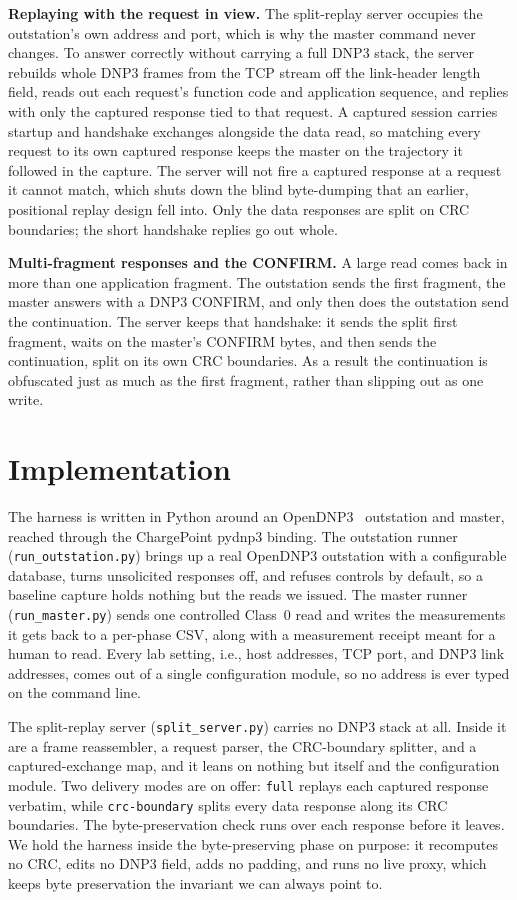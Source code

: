 \documentclass[conference]{IEEEtran}
\newcommand{\code}[1]{\texttt{#1}}
\begin{document}
\noindent\textbf{Replaying with the request in view.} The split-replay server
occupies the outstation's own address and port, which is why the master command
never changes. To answer correctly without carrying a full DNP3 stack, the server
rebuilds whole DNP3 frames from the TCP stream off the link-header length field,
reads out each request's function code and application sequence, and replies with
only the captured response tied to that request. A captured session carries
startup and handshake exchanges alongside the data read, so matching every
request to its own captured response keeps the master on the trajectory it
followed in the capture. The server will not fire a captured response at a request
it cannot match, which shuts down the blind byte-dumping that an earlier,
positional replay design fell into. Only the data responses are split on CRC
boundaries; the short handshake replies go out whole.

\noindent\textbf{Multi-fragment responses and the CONFIRM.} A large read comes
back in more than one application fragment. The outstation sends the first
fragment, the master answers with a DNP3 CONFIRM, and only then does the
outstation send the continuation. The server keeps that handshake: it sends the
split first fragment, waits on the master's CONFIRM bytes, and then sends the
continuation, split on its own CRC boundaries. As a result the continuation is
obfuscated just as much as the first fragment, rather than slipping out as one
write.

\section{Implementation}

The harness is written in Python around an OpenDNP3~\cite{ref:opendnp3} outstation
and master, reached through the ChargePoint pydnp3 binding. The outstation runner
(\code{run\_outstation.py}) brings up a real OpenDNP3 outstation with a
configurable database, turns unsolicited responses off, and refuses controls by
default, so a baseline capture holds nothing but the reads we issued. The master
runner (\code{run\_master.py}) sends one controlled Class~0 read and writes the
measurements it gets back to a per-phase CSV, along with a measurement receipt
meant for a human to read. Every lab setting, i.e., host addresses, TCP port, and
DNP3 link addresses, comes out of a single configuration module, so no address is
ever typed on the command line.

The split-replay server (\code{split\_server.py}) carries no DNP3 stack at all.
Inside it are a frame reassembler, a request parser, the CRC-boundary splitter,
and a captured-exchange map, and it leans on nothing but itself and the
configuration module. Two delivery modes are on offer: \code{full} replays each
captured response verbatim, while \code{crc-boundary} splits every data response
along its CRC boundaries. The byte-preservation check runs over each response
before it leaves. We hold the harness inside the byte-preserving phase on purpose:
it recomputes no CRC, edits no DNP3 field, adds no padding, and runs no live
proxy, which keeps byte preservation the invariant we can always point to.
\end{document}
